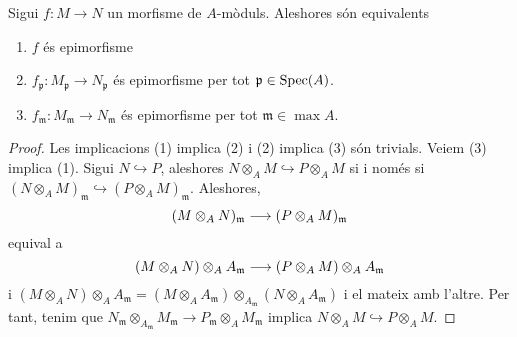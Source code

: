 \documentclass[../../../main.tex]{subfiles}
\begin{document}
\begin{coro}
\label{coro:morfismePropietatsLocalsExhaustivitat} Sigui $f:M\to N$ un morfisme de $A$-mòduls. Aleshores són equivalents
\begin{enumerate}[(1)]
    \item $f$ és epimorfisme
    \item $f_\mathfrak{p}:M_\mathfrak{p}\to N_\mathfrak{p}$ és epimorfisme per tot $\mathfrak{p}\in\mathrm{Spec}(A)$.
    \item $f_\mathfrak{m}:M_\mathfrak{m}\to N_\mathfrak{m}$ és epimorfisme per tot $\mathfrak{m}\in\max A$.
\end{enumerate}
\end{coro}
\begin{proof}
Les implicacions (1) implica (2) i (2) implica (3) són trivials. Veiem (3) implica (1). Sigui $N\hookrightarrow P$, aleshores $N\otimes_AM\hookrightarrow P\otimes_AM$ si i només si $(N\otimes_AM)_\mathfrak{m}\hookrightarrow (P\otimes_AM)_\mathfrak{m}$. Aleshores, 
\begin{equation}
    \notag
    (M\otimes_AN)_\mathfrak{m}\longrightarrow (P\otimes_AM)_\mathfrak{m}
\end{equation}
equival a
\begin{equation}
    \notag
    (M\otimes_AN)\otimes_AA_\mathfrak{m}\longrightarrow (P\otimes_AM)\otimes_AA_\mathfrak{m}
\end{equation}
i $(M\otimes_AN)\otimes_AA_\mathfrak{m} = (M\otimes_AA_\mathfrak{m})\otimes_{A_\mathfrak{m}}(N\otimes_AA_\mathfrak{m})$ i el mateix amb l'altre. Per tant, tenim que $N_\mathfrak{m}\otimes_{A_\mathfrak{m}}M_\mathfrak{m}\to P_\mathfrak{m}\otimes_AM_\mathfrak{m}$ implica $N\otimes_AM\hookrightarrow P\otimes_AM$.
\end{proof}
\end{document}
